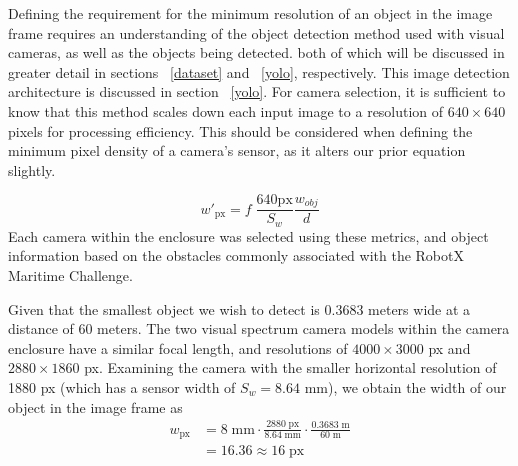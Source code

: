 \documentclass{erauthesis}
\begin{document}
Defining the requirement for the minimum resolution of an object in the image frame requires an understanding of the object detection method used with visual cameras, as well as the objects being detected. both of which will be discussed in greater detail in sections ~\ref{dataset} and ~\ref{yolo}, respectively.
This image detection architecture is discussed in section ~\ref{yolo}.
For camera selection, it is sufficient to know that this method scales down each input image to a resolution of $640 \times 640$ pixels for processing efficiency.
This should be considered when defining the minimum pixel density of a camera's sensor, as it alters our prior equation slightly.

\begin{equation}
\mathit{w}'_{\text{px}} = f \; \frac{640 \text{px}}{S_w}\frac{\mathit{w}_{obj}}{d}
\end{equation}
Each camera within the enclosure was selected using these metrics, and object information based on the obstacles commonly associated with the RobotX Maritime Challenge. %

Given that the smallest object we wish to detect is $0.3683$ meters wide at a distance of 60 meters.
The two visual spectrum camera models within the camera enclosure have a similar focal length, and resolutions of $4000 \times 3000$ px and $2880 \times 1860$ px. Examining the camera with the smaller horizontal resolution of 1880 px (which has a sensor width of $S_{w} = 8.64$ mm), we obtain the width of our object in the image frame as
\begin{equation*}
\begin{split}
    \mathit{w}_{\text{px}} & = 8\;\text{mm} \cdot \frac{2880\;\text{px}}{8.64\;\text{mm}} \cdot \frac{0.3683\;\text{m}}{60\;\text{m}}\\
     & = 16.36 \approx 16 \;\text{px}
\end{split}
\end{equation*}
\end{document}
